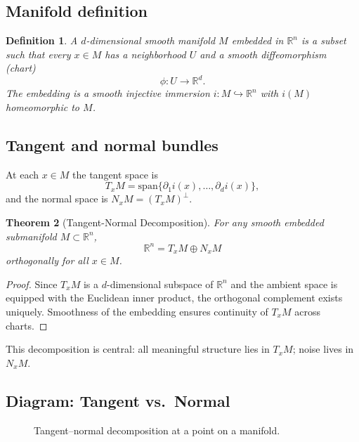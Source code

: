 \documentclass[11pt,a4paper,twocolumn]{article}
\newtheorem{theorem}{Theorem}[section]
\newtheorem{definition}[theorem]{Definition}
\begin{document}
\subsection{Manifold definition}

\begin{definition}
A $d$-dimensional smooth manifold $M$ embedded in $\mathbb{R}^n$ is a
subset such that every $x \in M$ has a neighborhood $U$ and a smooth
diffeomorphism (chart)
\[
\phi: U \to \mathbb{R}^d.
\]
The embedding is a smooth injective immersion $i: M \hookrightarrow
\mathbb{R}^n$ with $i(M)$ homeomorphic to $M$.
\end{definition}

\subsection{Tangent and normal bundles}

At each $x \in M$ the tangent space is
\[
T_x M = \mathrm{span}\big\{\partial_1 i(x), \dots, \partial_d i(x)\big\},
\]
and the normal space is $N_x M = (T_x M)^\perp$.

\begin{theorem}[Tangent-Normal Decomposition]
For any smooth embedded submanifold $M \subset \mathbb{R}^n$,
\[
\mathbb{R}^n = T_x M \oplus N_x M
\]
orthogonally for all $x \in M$.
\end{theorem}

\begin{proof}
Since $T_x M$ is a $d$-dimensional subspace of $\mathbb{R}^n$ and the
ambient space is equipped with the Euclidean inner product, the
orthogonal complement exists uniquely. Smoothness of the embedding
ensures continuity of $T_x M$ across charts.
\end{proof}

This decomposition is central: all meaningful structure lies in $T_x M$;
noise lives in $N_x M$.

\subsection{Diagram: Tangent vs.\ Normal}

\begin{figure}[H]
\centering
{}
\caption{Tangent--normal decomposition at a point on a manifold.}
\end{figure}
\end{document}
